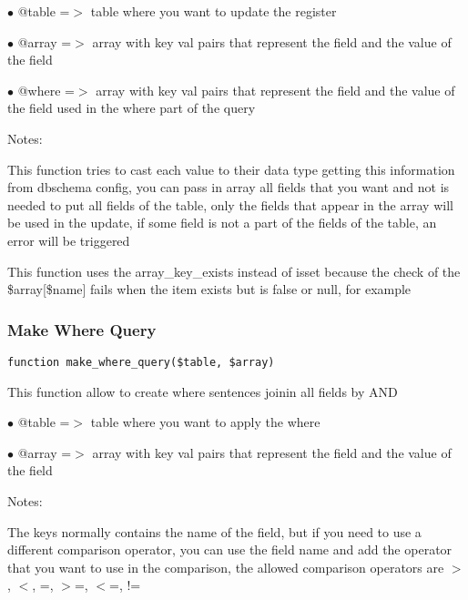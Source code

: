 \documentclass[a4paper]{article}
\begin{document}
\begin{compactitem}
\item[\color{myblue}$\bullet$] @table =$>$ table where you want to update the register
\item[\color{myblue}$\bullet$] @array =$>$ array with key val pairs that represent the field and the value of
          the field
\item[\color{myblue}$\bullet$] @where =$>$ array with key val pairs that represent the field and the value of
          the field used in the where part of the query
\end{compactitem}

Notes:

This function tries to cast each value to their data type getting this
information from dbschema config, you can pass in array all fields that
you want and not is needed to put all fields of the table, only the
fields that appear in the array will be used in the update, if some
field is not a part of the fields of the table, an error will be
triggered

This function uses the array\_key\_exists instead of isset because the
check of the \$array[\$name] fails when the item exists but is false or
null, for example

\hypertarget{toc227}{}
\subsubsection{Make Where Query}

\begin{lstlisting}
function make_where_query($table, $array)
\end{lstlisting}

This function allow to create where sentences joinin all fields by AND

\begin{compactitem}
\item[\color{myblue}$\bullet$] @table =$>$ table where you want to apply the where
\item[\color{myblue}$\bullet$] @array =$>$ array with key val pairs that represent the field and the value of
          the field
\end{compactitem}

Notes:

The keys normally contains the name of the field, but if you need to use
a different comparison operator, you can use the field name and add the
operator that you want to use in the comparison, the allowed comparison
operators are $>$, $<$, =, $>$=, $<$=, !=
\end{document}
